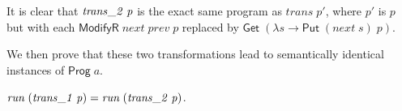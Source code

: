 \documentclass{llncs}
\newcommand{\Conid}[1]{\mathit{#1}}
\newcommand{\Varid}[1]{\mathit{#1}}
\let\Varid\mathit
\let\Conid\mathsf
\begin{document}
It is clear that \ensuremath{\Varid{trans\char95 2}\;\Varid{p}} is the exact same program as \ensuremath{\Varid{trans}\;\Varid{p'}}, where \ensuremath{\Varid{p'}}
is \ensuremath{\Varid{p}} but with each \ensuremath{\Conid{ModifyR}\;\Varid{next}\;\Varid{prev}\;\Varid{p}} replaced by \ensuremath{\Conid{Get}\;(\lambda \Varid{s}\to \Conid{Put}\;(\Varid{next}\;\Varid{s})\;\Varid{p})}.

We then prove that these two transformations lead to semantically identical
instances of \ensuremath{\Conid{Prog}\;\Varid{a}}.
\begin{lemma}
  \ensuremath{\Varid{run}\;(\Varid{trans\char95 1}\;\Varid{p})\mathrel{=}\Varid{run}\;(\Varid{trans\char95 2}\;\Varid{p})}. \checkmark
\end{lemma}

\end{document}
